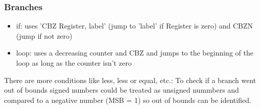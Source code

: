 \documentclass[a4paper]{scrartcl}
\begin{document}
            \subsubsection*{Branches}
            \begin{itemize}
                \item if: uses 'CBZ Register, label' (jump to 'label' if Register is zero) and CBZN (jump if not zero)
                \item loop: uses a decreasing counter and CBZ and jumps to the beginning of the loop as long as the counter isn't zero
            \end{itemize}
            There are more conditions like less, less or equal, etc.: 
            To check if a branch went out of bounds signed numbers could be treated as unsigned nummbers and compared to a negative number (MSB = 1) so out of bounds can be identified. 
\end{document}
